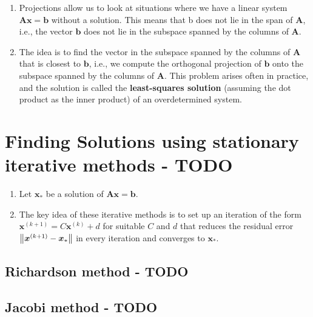 \begin{enumerate}
    \item Projections allow us to look at situations where we have a linear system $\bm{Ax} = \bm{b}$ without a solution.
    This means that b does not lie in the span of $\bm{A}$, i.e., the vector $\bm{b}$ does not lie in the subspace spanned by the columns of $\bm{A}$.
    \hfill \cite{mfml/book/mml/Deisenroth-Faisal-Ong}

    \item The idea is to find the vector in the subspace spanned by the columns of $\bm{A}$ that is closest to $\bm{b}$, i.e., we compute the orthogonal projection of $\bm{b}$ onto the subspace spanned by the columns of $\bm{A}$.
    This problem arises often in practice, and the solution is called the \textbf{least-squares solution} (assuming the dot product as the inner product) of an overdetermined system.
    \hfill \cite{mfml/book/mml/Deisenroth-Faisal-Ong}
\end{enumerate}











\section{Finding Solutions using stationary iterative methods - TODO}

\begin{enumerate}
    \item Let $\bm{x}_\ast$ be a solution of $\bm{Ax} = \bm{b}$.
    \hfill \cite{mfml/book/mml/Deisenroth-Faisal-Ong}

    \item The key idea of these iterative methods is to set up an iteration of the form
    $
        \bm{x}^{(k+1)} = C\bm{x}^{(k)} + d
    $
    for suitable $C$ and $d$ that reduces the residual error $\left\| \bm{x}^{(k+1)} - \bm{x}_\ast \right\|$ in every iteration and converges to $\bm{x}_\ast$.
    \hfill \cite{mfml/book/mml/Deisenroth-Faisal-Ong}

\end{enumerate}


\subsection{Richardson method - TODO}


\subsection{Jacobi method - TODO}


